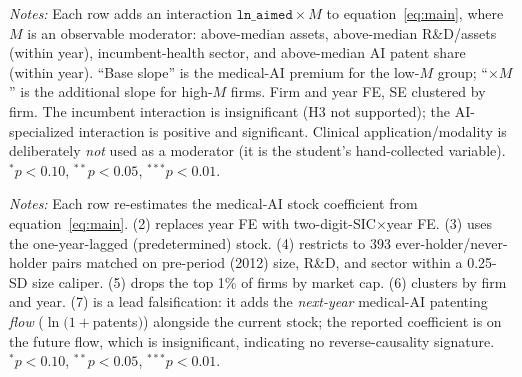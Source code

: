 \documentclass[12pt]{article}
\begin{document}
\begin{table}[htbp]\centering
\begin{threeparttable}
\caption{Heterogeneity of the value premium by observable moderators (DV $=$ Tobin's Q)}
\label{tab:hetero}\small

\begin{tablenotes}\small\item \textit{Notes:} Each row adds an interaction
$\texttt{ln\_aimed}\times M$ to equation~\eqref{eq:main}, where $M$ is an observable moderator:
above-median assets, above-median R\&D/assets (within year), incumbent-health sector, and
above-median AI patent share (within year). ``Base slope'' is the medical-AI premium for the
low-$M$ group; ``$\times M$'' is the additional slope for high-$M$ firms. Firm and year FE,
SE clustered by firm. The incumbent interaction is insignificant (H3 not supported); the
AI-specialized interaction is positive and significant. Clinical application/modality is
deliberately \emph{not} used as a moderator (it is the student's hand-collected variable).
$^{*}p<0.10$, $^{**}p<0.05$, $^{***}p<0.01$.
\end{tablenotes}
\end{threeparttable}
\end{table}

\begin{table}[htbp]\centering
\begin{threeparttable}
\caption{Alternative identification and robustness (DV $=$ Tobin's Q)}\label{tab:altid}\small

\begin{tablenotes}\small\item \textit{Notes:} Each row re-estimates the medical-AI stock coefficient
from equation~\eqref{eq:main}. (2) replaces year FE with two-digit-SIC$\times$year FE. (3) uses the
one-year-lagged (predetermined) stock. (4) restricts to 393 ever-holder/never-holder pairs matched
on pre-period (2012) size, R\&D, and sector within a 0.25-SD size caliper. (5) drops the top 1\% of
firms by market cap. (6) clusters by firm and year. (7) is a lead falsification: it adds the
\emph{next-year} medical-AI patenting \emph{flow} ($\ln(1+$patents$)$) alongside the current stock;
the reported coefficient is on the future flow, which is insignificant, indicating no
reverse-causality signature. $^{*}p<0.10$, $^{**}p<0.05$, $^{***}p<0.01$.
\end{tablenotes}
\end{threeparttable}
\end{table}
\end{document}
